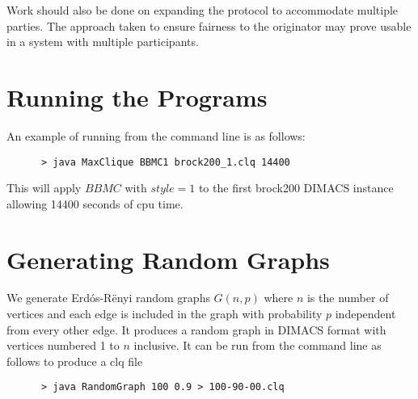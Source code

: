 \documentclass{l4proj}
\begin{document}
Work should also be done on expanding the protocol to accommodate multiple parties. The approach taken to ensure fairness to the originator may prove usable in a system with multiple participants.




\begin{appendices}

\chapter{Running the Programs}
An example of running from the command line is as follows:
\begin{verbatim}
      > java MaxClique BBMC1 brock200_1.clq 14400
\end{verbatim}
This will apply $BBMC$ with $style = 1$ to the first brock200 DIMACS instance allowing 14400 seconds of cpu time.

\chapter{Generating Random Graphs}
\label{sec:randomGraph}
We generate Erd\'{o}s-R\"{e}nyi random graphs $G(n,p)$ where $n$ is the number of vertices and
each edge is included in the graph with probability $p$ independent from every other edge. It produces
a random graph in DIMACS format with vertices numbered 1 to $n$ inclusive. It can be run from the command line as follows to produce 
a clq file
\begin{verbatim}
      > java RandomGraph 100 0.9 > 100-90-00.clq
\end{verbatim}
\end{appendices}

\nocite{*}


\end{document}
